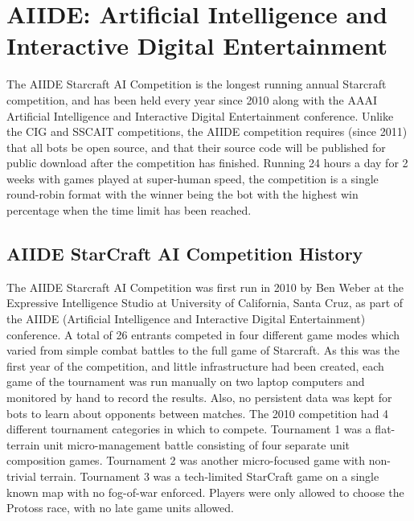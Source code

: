\section{AIIDE: Artificial Intelligence and Interactive Digital Entertainment}\label{subsecAIIDE}

The AIIDE Starcraft AI Competition is the longest running annual Starcraft competition, and has been held every year since 2010 along with the AAAI Artificial Intelligence and Interactive Digital Entertainment conference. Unlike the CIG and SSCAIT competitions, the AIIDE competition requires (since 2011) that all bots be open source, and that their source code will be published for public download after the competition has finished. Running 24 hours a day for 2 weeks with games played at super-human speed, the competition is a single round-robin format with the winner being the bot with the highest win percentage when the time limit has been reached. 

\subsection{AIIDE StarCraft AI Competition History}

The AIIDE Starcraft AI Competition was first run in 2010 by Ben Weber at the Expressive Intelligence Studio at University of California, Santa Cruz, as part of the AIIDE (Artificial Intelligence and Interactive Digital Entertainment) conference. A total of 26 entrants competed in four different game modes which varied from simple combat battles to the full game of Starcraft. As this was the first year of the competition, and little infrastructure had been created, each game of the tournament was run manually on two laptop computers and monitored by hand to record the results. Also, no persistent data was kept for bots to learn about opponents between matches. The 2010 competition had 4 different tournament categories in which to compete. Tournament 1 was a flat-terrain unit micro-management battle consisting of four separate unit composition games. Tournament 2 was another micro-focused game with non-trivial terrain. Tournament 3 was a tech-limited StarCraft game on a single known map with no fog-of-war enforced. Players were only allowed to choose the Protoss race, with no late game units allowed. 

